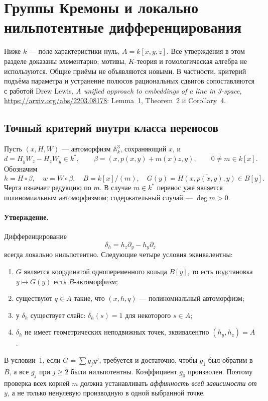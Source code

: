 \section{Группы Кремоны и локально нильпотентные дифференцирования}

Ниже $k$ --- поле характеристики нуль, $A=k[x,y,z]$. Все утверждения в
этом разделе доказаны элементарно; мотивы, $K$-теория и гомологическая
алгебра не используются. Общие приёмы не объявляются новыми. В частности,
критерий подъёма параметра и устранение полюсов рациональных сдвигов
сопоставляются с работой Drew Lewis,
\emph{A unified approach to embeddings of a line in 3-space},
\url{https://arxiv.org/abs/2203.08178}: Lemma~1, Theorem~2 и Corollary~4.

\subsection{Точный критерий внутри класса переносов}

Пусть $(x,H,W)$ --- автоморфизм $\mathbb A^3_k$, сохраняющий $x$, и
\[
 d=H_yW_z-H_zW_y\in k^*,\qquad
 \beta=(x,p(x,y)+m(x)z,y),\qquad 0\ne m\in k[x].
\]
Обозначим
\[
 h=H\circ\beta,\quad w=W\circ\beta,\quad
 B=k[x]/(m),\quad G(y)=\overline{H(x,p(x,y),y)}\in B[y].
\]
Черта означает редукцию по $m$. В случае $m\in k^*$ перенос уже является
полиномиальным автоморфизмом; содержательный случай --- $\deg m>0$.

\paragraph{Утверждение.}
Дифференцирование
\[
 \delta_h=h_z\partial_y-h_y\partial_z
\]
всегда локально нильпотентно. Следующие четыре условия эквивалентны:
\begin{enumerate}
\item $G$ является координатой однопеременного кольца $B[y]$, то есть
подстановка $y\mapsto G(y)$ есть $B$-автоморфизм;
\item существуют $q\in A$ такие, что $(x,h,q)$ --- полиномиальный
автоморфизм;
\item у $\delta_h$ существует слайс: $\delta_h(s)=1$ для некоторого $s\in A$;
\item $\delta_h$ не имеет геометрических неподвижных точек, эквивалентно
$(h_y,h_z)=A$.
\end{enumerate}
В условии~1, если $G=\sum g_jy^j$, требуется и достаточно, чтобы $g_1$
был обратим в $B$, а все $g_j$ при $j\ge2$ были нильпотентны. Коэффициент
$g_0$ произволен. Поэтому проверка всех корней $m$ должна устанавливать
\emph{аффинность всей зависимости от $y$}, а не только ненулевую производную
в одной выбранной точке.


